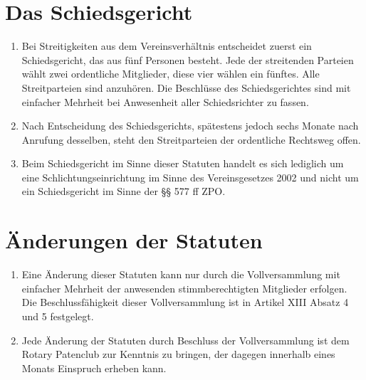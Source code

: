 \documentclass{article}
\begin{document}
\section{Das Schiedsgericht}
\begin{enumerate}
    \item Bei Streitigkeiten aus dem Vereinsverhältnis entscheidet zuerst ein Schiedsgericht, das aus fünf Personen besteht. Jede der streitenden Parteien wählt zwei ordentliche Mitglieder, diese vier wählen ein fünftes. Alle Streitparteien sind anzuhören. Die Beschlüsse des Schiedsgerichtes sind mit einfacher Mehrheit bei Anwesenheit aller Schiedsrichter zu fassen.
    \item Nach Entscheidung des Schiedsgerichts, spätestens jedoch sechs Monate nach Anrufung desselben, steht den Streitparteien der ordentliche Rechtsweg offen.
    \item Beim Schiedsgericht im Sinne dieser Statuten handelt es sich lediglich um eine Schlichtungseinrichtung im Sinne des Vereinsgesetzes 2002 und nicht um ein Schiedsgericht im Sinne der §§ 577 ff ZPO.
\end{enumerate}

\section{Änderungen der Statuten}
\begin{enumerate}
    \item Eine Änderung dieser Statuten kann nur durch die Vollversammlung mit einfacher Mehrheit der anwesenden stimmberechtigten Mitglieder erfolgen. Die Beschlussfähigkeit dieser Vollversammlung ist in Artikel XIII Absatz 4 und 5 festgelegt.
    \item Jede Änderung der Statuten durch Beschluss der Vollversammlung ist dem Rotary Patenclub zur Kenntnis zu bringen, der dagegen innerhalb eines Monats Einspruch erheben kann.
\end{enumerate}
\end{document}
